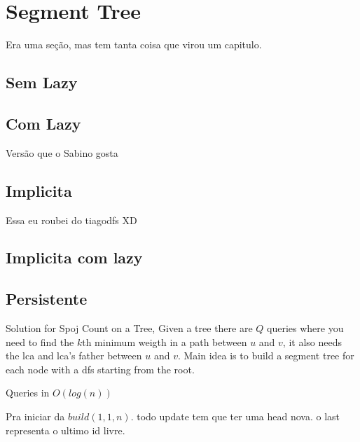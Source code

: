 \chapter{Segment Tree}
    Era uma seção, mas tem tanta coisa que virou um capitulo.
    \section{Sem Lazy}
    

    \section{Com Lazy}
    

    Versão que o Sabino gosta
    
   
    \section{Implicita}
    Essa eu roubei do tiagodfs XD
    
    
    \section{Implicita com lazy}
    
    
    \section{Persistente}
    Solution for Spoj Count on a Tree,
    Given a tree there are $Q$ queries where you need to find the $k$th minimum weigth in a path between $u$ and $v$, it also needs the lca and lca's father between $u$ and $v$.\newline
    Main idea is to build a segment tree for each node with a dfs starting from the root.
    
    Queries in $O(log(n))$

    Pra iniciar da $build(1,1,n)$.
    todo update tem que ter uma head nova. o last representa o ultimo id livre.
    
